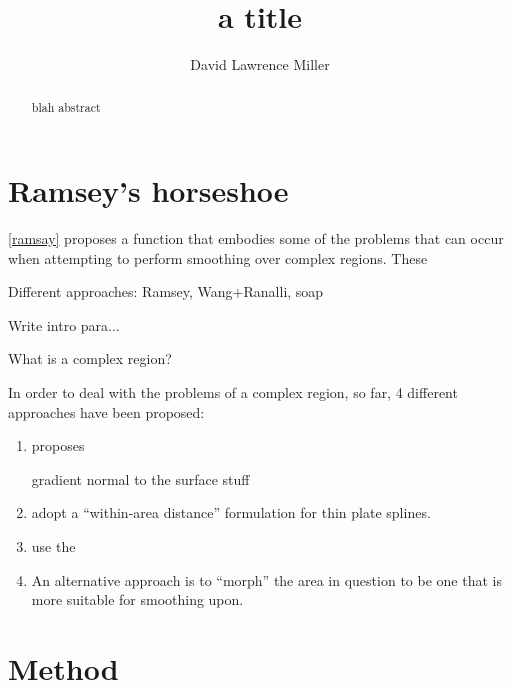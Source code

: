 \documentclass[a4paper,10pt]{amsart}
\title{a title}
\author{David Lawrence Miller}
\begin{document}
\begin{abstract}
blah abstract
\end{abstract}


\newtheorem{thm}{Theorem}[section]

\newtheorem{defn}{Definition}[section]

\maketitle



\section{Ramsey's horseshoe}

\ref{ramsay} proposes a function that embodies some of the problems that can occur when attempting to perform smoothing over complex regions. These

Different approaches: Ramsey, Wang+Ranalli, soap

Write intro para...

What is a complex region?



In order to deal with the problems of a complex region, so far, 4 different approaches have been proposed:

\begin{enumerate}
\item \cite{ramsay} proposes

gradient normal to the surface stuff



\item \cite{wangranalli} adopt a ``within-area distance'' formulation for thin plate splines.




\item \cite{soap} use the 

\item An alternative approach is to ``morph'' the area in question to be one that is more suitable for smoothing upon.

\end{enumerate}




\section{Method}
\end{document}
